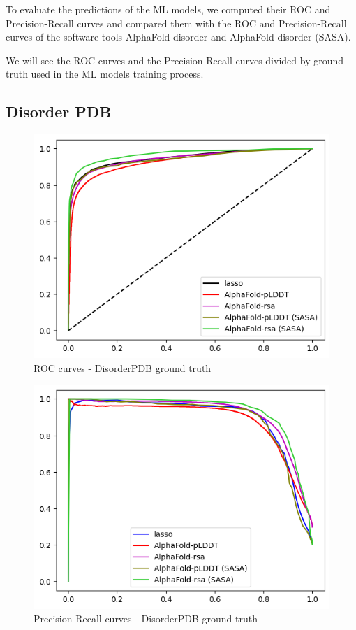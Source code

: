 To evaluate the predictions of the ML models, we computed their ROC and Precision-Recall curves and compared them with the ROC and Precision-Recall curves of the software-tools AlphaFold-disorder and AlphaFold-disorder (SASA).

We will see the ROC curves and the Precision-Recall curves divided by ground truth used in the ML models training process.

\vspace{5em}

\pagebreak

\subsection{Disorder PDB}

\begin{figure}[h!]
    \centering
    \includegraphics[scale = 0.8]{res/ML/roc-disorderpdb.png}
    \caption{ROC curves - DisorderPDB ground truth}
\end{figure}

\begin{figure}[h!]
    \centering
    \includegraphics[scale = 0.8]{res/ML/precisionrecall-disorderpdb.png}
    \caption{Precision-Recall curves - DisorderPDB ground truth}
\end{figure}

